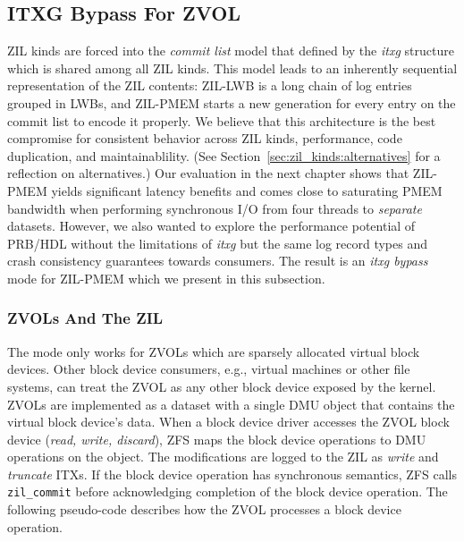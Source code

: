 \documentclass[12pt,a4paper,twoside]{book}
\begin{document}
\subsection{ITXG Bypass For ZVOL}\label{sec:itxgbypass}
ZIL kinds are forced into the \textit{commit list} model that defined by the \textit{itxg} structure which is shared among all ZIL kinds.
This model leads to an inherently sequential representation of the ZIL contents:
ZIL-LWB is a long chain of log entries grouped in LWBs, and ZIL-PMEM starts a new generation for every entry on the commit list to encode it properly.
We believe that this architecture is the best compromise for consistent behavior across ZIL kinds, performance, code duplication, and maintainablility.
(See Section~\ref{sec:zil_kinds:alternatives} for a reflection on alternatives.)
Our evaluation in the next chapter shows that ZIL-PMEM yields significant latency benefits and comes close to saturating PMEM bandwidth when performing synchronous I/O from four threads to \textit{separate} datasets.
However, we also wanted to explore the performance potential of PRB/HDL without the limitations of \textit{itxg} but the same log record types and crash consistency guarantees towards consumers.
The result is an \textit{itxg bypass} mode for ZIL-PMEM which we present in this subsection.

\subsubsection{ZVOLs And The ZIL}\label{sec:itxgbypass:openzfsbackground_zvols}
The mode only works for ZVOLs which are sparsely allocated virtual block devices.
Other block device consumers, e.g., virtual machines or other file systems, can treat the ZVOL as any other block device exposed by the kernel.
ZVOLs are implemented as a dataset with a single DMU object that contains the virtual block device's data.
When a block device driver accesses the ZVOL block device (\textit{read, write, discard}), ZFS maps the block device operations to DMU operations on the object.
The modifications are logged to the ZIL as \textit{write} and \textit{truncate} ITXs.
If the block device operation has synchronous semantics, ZFS calls \lstinline{zil_commit} before acknowledging completion of the block device operation.
The following pseudo-code describes how the ZVOL processes a block device operation.
\end{document}
